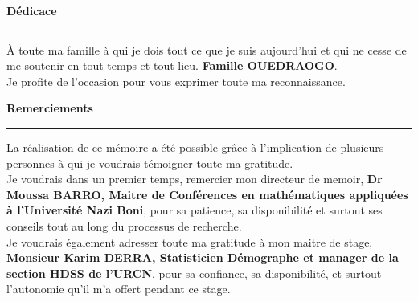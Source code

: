 \documentclass[12pt]{article}
\begin{document}
		\newpage
	
	\renewcommand{\thepage}{\small\roman{page}}
	
	\begin{flushright} %
		\textbf{\Large Dédicace}
		
		\rule{0.8\linewidth}{0.4pt} %
		\vspace{0.5cm}
		
		
		À toute ma famille à qui je dois tout ce que je suis aujourd'hui et qui ne cesse de me soutenir en tout temps et tout lieu. \textbf{Famille OUEDRAOGO}.\\
		Je profite de l’occasion pour vous exprimer toute ma reconnaissance.
	\end{flushright}
	
	\vspace{1.5cm}
	
	\newpage
	
	\begin{flushright} %
		\textbf{\Large Remerciements}

			\rule{0.8\linewidth}{0.4pt} %
		\vspace{0.5cm}
	
	\end{flushright}
	
	La réalisation de ce mémoire a été possible grâce à l'implication de plusieurs personnes à qui
	je voudrais témoigner toute ma gratitude.\\
	
	
	Je voudrais dans un premier temps, remercier mon directeur de memoir, \textbf{Dr Moussa BARRO, Maitre de Conférences en mathématiques appliquées
	à l’Université Nazi Boni}, pour sa patience, sa disponibilité et surtout ses conseils  tout au long du processus de recherche.\\
	
	
	Je voudrais également adresser toute ma gratitude à mon maitre de stage, \textbf{Monsieur Karim DERRA, Statisticien Démographe et manager de la section HDSS de l'URCN}, pour sa confiance, sa disponibilité, et surtout l’autonomie qu’il m’a offert pendant ce stage.\\
	
\end{document}
